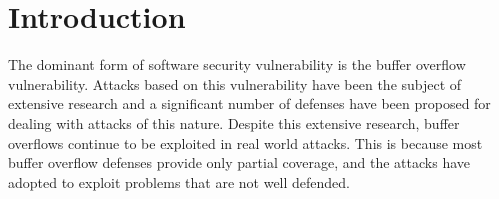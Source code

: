 
\renewcommand{\thechapter}{1}

\chapter{Introduction}

The dominant form of software security vulnerability is the buffer overflow vulnerability. Attacks
based on this vulnerability have been the subject of extensive research and a significant number of
defenses have been proposed for dealing with attacks of this nature. Despite this extensive
research, buffer overflows continue to be exploited in real world attacks. This is because most
buffer overflow defenses provide only partial coverage, and the attacks have adopted to exploit
problems that are not well defended.

